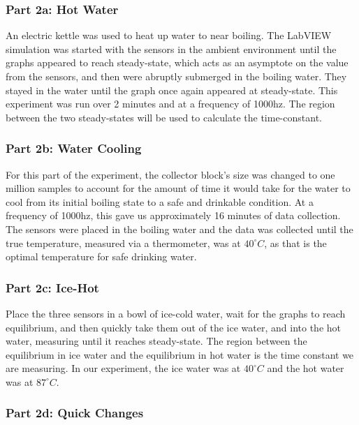 \documentclass{article}
\begin{document}
\subsubsection{Part 2a: Hot Water} %

An electric kettle was used to heat up water to near boiling.  The LabVIEW simulation was started with the sensors in the ambient environment until the graphs appeared to reach steady-state, which acts as an asymptote on the value from the sensors, and then were abruptly submerged in the boiling water.  They stayed in the water until the graph once again appeared at steady-state.  This experiment was run over 2 minutes and at a frequency of 1000hz.  The region between the two steady-states will be used to calculate the time-constant.  

\subsubsection{Part 2b: Water Cooling} %

For this part of the experiment, the collector block's size was changed to one million samples to account for the amount of time it would take for the water to cool from its initial boiling state to a safe and drinkable condition.  At a frequency of 1000hz, this gave us approximately 16 minutes of data collection.  The sensors were placed in the boiling water and the data was collected until the true temperature, measured via a thermometer, was at \(40^\circ C\), as that is the optimal temperature for safe drinking water.  

\subsubsection{Part 2c: Ice-Hot} %

Place the three sensors in a bowl of ice-cold water, wait for the graphs to reach equilibrium, and then quickly take them out of the ice water, and into the hot water, measuring until it reaches steady-state.  The region between the equilibrium in ice water and the equilibrium in hot water is the time constant we are measuring.  In our experiment, the ice water was at \(40^\circ C\) and the hot water was at \(87^\circ C\).  

\subsubsection{Part 2d: Quick Changes} %
\end{document}
